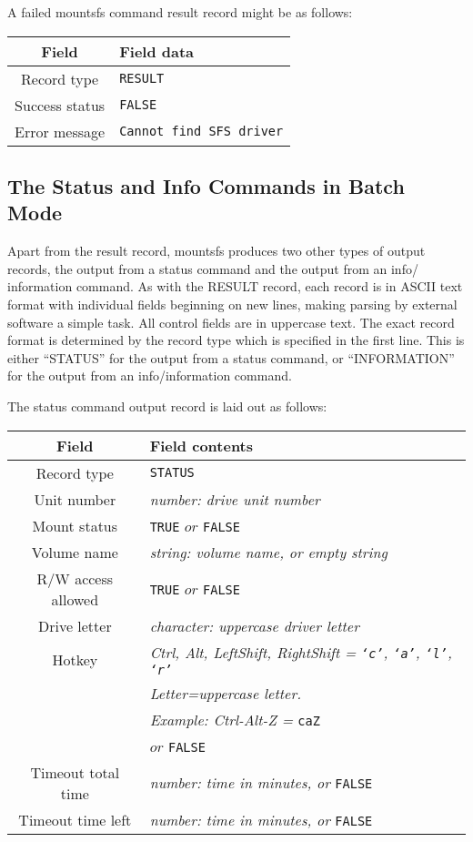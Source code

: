 A failed mountsfs command result record might be as follows:

\begin{center}
\begin{tabular}{|c|l|}
\hline
    Field              &     Field data\\
\hline
    Record type        &     {\tt RESULT}\\
    Success status     &     {\tt FALSE}\\
    Error message      &     {\tt Cannot find SFS driver}\\
\hline
\end{tabular}
\end{center}


\subsection{The Status and Info Commands in Batch Mode}

Apart from the result record, mountsfs produces two other types of output
records, the output from a status command and the output from an info/
information command.  As with the RESULT record, each record is in ASCII text
format with individual fields beginning on new lines, making parsing by
external software a simple task.  All control fields are in uppercase text.
The exact record format is determined by the record type which is specified in
the first line.  This is either ``STATUS'' for the output from a status command,
or ``INFORMATION'' for the output from an info/information command.

The status command output record is laid out as follows:

\begin{center}
\begin{tabular}{|c|l|}
\hline
    Field              & Field contents\\
\hline
    Record type        & {\tt STATUS}\\
    Unit number        & {\em number: drive unit number}\\
    Mount status       & {\tt TRUE} $or$ {\tt FALSE}\\
    Volume name        & {\em string: volume name, or empty string}\\
    R/W access allowed & {\tt TRUE} $or$ {\tt FALSE}\\
    Drive letter       & {\em character: uppercase driver letter}\\
    Hotkey             & {\em Ctrl, Alt, LeftShift, RightShift = {\tt `c'}, {\tt `a'}, {\tt `l'}, {\tt `r'}}\\
                       & {\em Letter=uppercase letter.}\\
                       & {\em Example: Ctrl-Alt-Z = }{\tt caZ}\\
                       & $or$ {\tt FALSE}\\
    Timeout total time & {\em number: time in minutes, or} {\tt FALSE}\\
    Timeout time left  & {\em number: time in minutes, or} {\tt FALSE}\\
\hline
\end{tabular}
\end{center}

